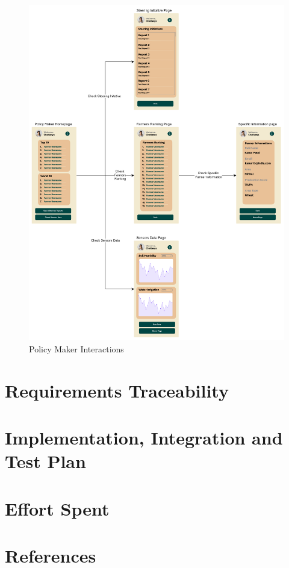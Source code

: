 \documentclass[table, 12pt]{article}
\begin{document}
\begin{center}
    \begin{figure}[H]
        \vspace{-100px}
        \includegraphics[scale=0.7, center]{assets/MockUp/PMInteractoins.png}
        \caption{Policy Maker Interactions}
        \label{fig: PMInter}
    \end{figure}
\end{center}
\section{Requirements Traceability}


\section{Implementation, Integration and Test Plan}


\section{Effort Spent}


\section{References}
\end{document}
